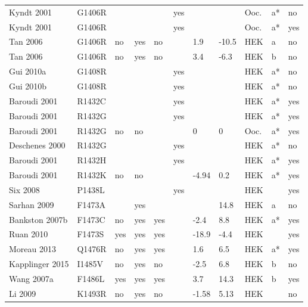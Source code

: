 \begin{tiny}
\begin{longtable}{p{4cm}|l|llll|ll|lll}
Kyndt 2001\cite{Kyndt2001MutationDB} & G1406R &  &  &  & yes &  &  & Ooc. & a* & no \\
Kyndt 2001\cite{Kyndt2001MutationDB} & G1406R &  &  &  & yes &  &  & Ooc. & a* & yes \\
Tan 2006\cite{Tan2006MutationDB} & G1406R & no & yes & no &  & 1.9 & -10.5 & HEK & a & no \\
Tan 2006\cite{Tan2006MutationDB} & G1406R & no & yes & no &  & 3.4 & -6.3 & HEK & b & no \\
Gui 2010a\cite{Gui2010aMutationDB} & G1408R &  &  &  & yes &  &  & HEK & a* & no \\
Gui 2010b\cite{Gui2010bMutationDB} & G1408R &  &  &  & yes &  &  & HEK & a* & no \\
Baroudi 2001\cite{Baroudi2001MutationDB} & R1432C &  &  &  & yes &  &  & HEK & a* & yes \\
Baroudi 2001\cite{Baroudi2001MutationDB} & R1432G &  &  &  & yes &  &  & HEK & a* & yes \\
Baroudi 2001\cite{Baroudi2001MutationDB} & R1432G & no & no &  &  & 0 & 0 & Ooc. & a* & yes \\
Deschenes 2000\cite{Deschenes2000MutationDB} & R1432G &  &  &  & yes &  &  & HEK & a* & no \\
Baroudi 2001\cite{Baroudi2001MutationDB} & R1432H &  &  &  & yes &  &  & HEK & a* & yes \\
Baroudi 2001\cite{Baroudi2001MutationDB} & R1432K & no & no &  &  & -4.94 & 0.2 & HEK & a* & yes \\
Six 2008\cite{Six2008MutationDB} & P1438L &  &  &  & yes &  &  & HEK &  & yes \\
Sarhan 2009\cite{Sarhan2009MutationDB} & F1473A &  & yes &  &  &  & 14.8 & HEK & a & no \\
Bankston 2007b\cite{Bankston2007bMutationDB} & F1473C & no & yes & yes &  & -2.4 & 8.8 & HEK & a* & yes \\
Ruan 2010\cite{Ruan2010MutationDB} & F1473S & yes & yes & yes &  & -18.9 & -4.4 & HEK &  & yes \\
Moreau 2013\cite{Moreau2013MutationDB} & Q1476R & no & yes & yes &  & 1.6 & 6.5 & HEK & a* & yes \\
Kapplinger 2015\cite{Kapplinger2015MutationDB} & I1485V & no & yes & no &  & -2.5 & 6.8 & HEK & b & no \\
Wang 2007a\cite{Wang2007aMutationDB} & F1486L & yes & yes & yes &  & 3.7 & 14.3 & HEK & b & yes \\
Li 2009\cite{Li2009MutationDB} & K1493R & no & yes & no &  & -1.58 & 5.13 & HEK &  & no \\

\end{longtable}
\end{tiny}
